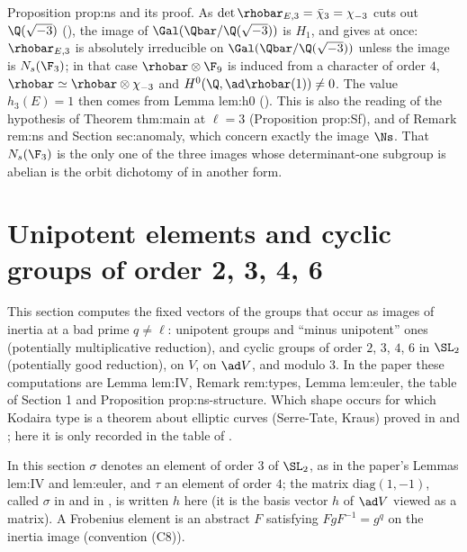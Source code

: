 \begin{paperlink}
Proposition prop:ns and its proof. As $\det\rhobar_{E,3}=\bar\chi_3=\chi_{-3}$ cuts out $\Q(\sqrt{-3})$ (), the image of $\Gal(\Qbar/\Q(\sqrt{-3}))$ is $H_1$,
and  gives at once: $\rhobar_{E,3}$ is absolutely irreducible on $\Gal(\Qbar/\Q(\sqrt{-3}))$ unless the image is $N_s(\F_3)$; in that
case $\rhobar\otimes\F_9$ is induced from a character of order $4$, $\rhobar\simeq\rhobar\otimes\chi_{-3}$ and $H^0(\Q,\ad\rhobar(1))\ne0$. The value $h_3(E)=1$ then comes from
Lemma lem:h0 (). This is also the reading of the hypothesis of Theorem thm:main at $\ell=3$ (Proposition prop:Sf),
and of Remark rem:ns and Section sec:anomaly, which concern exactly the image $\Ns$. That $N_s(\F_3)$ is the only one of the three images
whose determinant-one subgroup is abelian is the orbit dichotomy of  in another form.
\end{paperlink}

\section{Unipotent elements and cyclic groups of order 2, 3, 4, 6}\label{sec:reps:cyclic}

This section computes the fixed vectors of the groups that occur as images of inertia at a bad prime $q\ne\ell$: unipotent groups and
``minus unipotent'' ones (potentially multiplicative reduction), and cyclic groups of order $2$, $3$, $4$, $6$ in $\SL_2$ (potentially good
reduction), on $V$, on $\ad V$, and modulo $3$. In the paper these computations are Lemma lem:IV, Remark rem:types, Lemma lem:euler, the
table of Section 1 and Proposition prop:ns-structure. Which shape occurs for which Kodaira type is a theorem about elliptic curves
(Serre-Tate, Kraus) proved in  and ; here it is only recorded in the table of .

\begin{convention}\label{conv:reps:sigma}
In this section $\sigma$ denotes an element of order $3$ of $\SL_2$, as in the paper's Lemmas lem:IV and lem:euler, and $\tau$ an element of
order $4$; the matrix $\mathrm{diag}(1,-1)$, called $\sigma$ in  and in , is written $h$ here (it is the basis vector $h$ of $\ad V$
viewed as a matrix). A Frobenius element is an abstract $F$ satisfying $FgF^{-1}=g^q$ on the inertia image (convention (C8)).
\end{convention}

